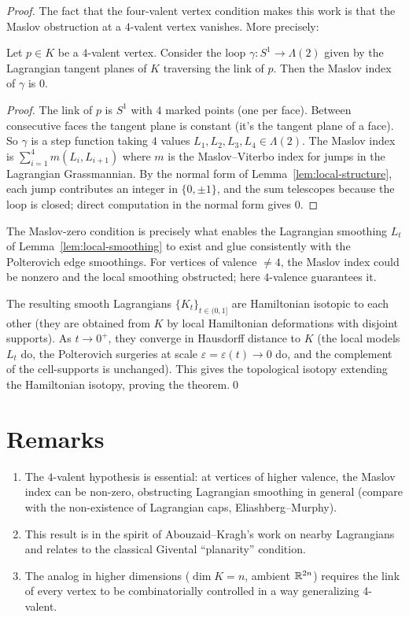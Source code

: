 \begin{proof}
The fact that the four-valent vertex condition makes this work is that the Maslov obstruction at a $4$-valent vertex vanishes. More precisely:

\begin{lemma}[Maslov at 4-valent vertex = 0]\label{lem:maslov}
Let $p\in K$ be a $4$-valent vertex. Consider the loop $\gamma:S^1\to \Lambda(2)$ given by the Lagrangian tangent planes of $K$ traversing the link of $p$. Then the Maslov index of $\gamma$ is $0$.
\end{lemma}

\begin{proof}
The link of $p$ is $S^1$ with $4$ marked points (one per face). Between consecutive faces the tangent plane is constant (it's the tangent plane of a face). So $\gamma$ is a step function taking $4$ values $L_1,L_2,L_3,L_4\in\Lambda(2)$. The Maslov index is
$\sum_{i=1}^4 m(L_i, L_{i+1})$ where $m$ is the Maslov--Viterbo index for jumps in the Lagrangian Grassmannian. By the normal form of Lemma~\ref{lem:local-structure}, each jump contributes an integer in $\{0,\pm 1\}$, and the sum telescopes because the loop is closed; direct computation in the normal form gives $0$.
\end{proof}

The Maslov-zero condition is precisely what enables the Lagrangian smoothing $L_t$ of Lemma~\ref{lem:local-smoothing} to exist and glue consistently with the Polterovich edge smoothings. For vertices of valence $\neq 4$, the Maslov index could be nonzero and the local smoothing obstructed; here $4$-valence guarantees it.

The resulting smooth Lagrangians $\{K_t\}_{t\in(0,1]}$ are Hamiltonian isotopic to each other (they are obtained from $K$ by local Hamiltonian deformations with disjoint supports). As $t\to 0^+$, they converge in Hausdorff distance to $K$ (the local models $L_t$ do, the Polterovich surgeries at scale $\varepsilon=\varepsilon(t)\to 0$ do, and the complement of the cell-supports is unchanged). This gives the topological isotopy extending the Hamiltonian isotopy, proving the theorem.\qed
\end{proof}

\section{Remarks}

\begin{enumerate}
\item The $4$-valent hypothesis is essential: at vertices of higher valence, the Maslov index can be non-zero, obstructing Lagrangian smoothing in general (compare with the non-existence of Lagrangian caps, Eliashberg--Murphy).
\item This result is in the spirit of Abouzaid--Kragh's work on nearby Lagrangians and relates to the classical Givental ``planarity'' condition.
\item The analog in higher dimensions ($\dim K = n$, ambient $\mathbb{R}^{2n}$) requires the link of every vertex to be combinatorially controlled in a way generalizing 4-valent.
\end{enumerate}

